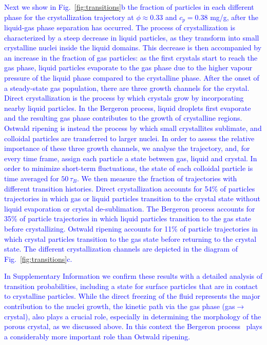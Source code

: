 \documentclass[preprint,amsmath,amssymb,superscriptaddress]{revtex4-1}
\begin{document}
\textcolor{blue}{
Next we show in Fig.~\ref{fig:transitions}b the fraction of particles in each different phase for the crystallization trajectory at
$\phi\approx 0.33$ and $c_p=0.38$ mg/g, after the liquid-gas phase separation has occurred.
The process of crystallization is characterized 
by a steep decrease in liquid particles, as they transform into small crystalline nuclei inside the liquid domains. This decrease
is then accompanied by an increase in the fraction of gas particles: as the first crystals start to reach the gas phase, liquid particles evaporate 
to the gas phase due to the higher vapour pressure of the liquid phase compared to the crystalline phase. After the onset 
of a steady-state gas population, there are three growth channels for the crystal. Direct crystallization is the process by which 
crystals grow by incorporating nearby liquid particles. In the Bergeron process, liquid droplets first evaporate and the resulting gas phase 
contributes to the growth of crystalline regions. Ostwald ripening is instead the process by which small crystallites sublimate, and colloidal
particles are transferred to larger nuclei. In order to assess the relative importance of these three growth channels, we analyse the trajectory, and, for every time frame, assign each particle a state between gas, liquid and crystal. In order to minimize short-term fluctuations, the state of each colloidal particle is time averaged for $50\,\tau_B$. We then measure the fraction of trajectories with different transition histories.
Direct crystallization accounts for 54\% of particles trajectories in which
gas or liquid particles transition to the crystal state without liquid evaporation or crystal de-sublimation. The Bergeron process accounts for 35\% of particle trajectories in which liquid particles
transition to the gas state before crystallizing. Ostwald ripening accounts for 11\% of particle trajectories in which crystal particles transition to the gas state before returning
to the crystal state. The different crystallization channels are depicted in the diagram of Fig.~\ref{fig:transitions}c.}

\textcolor{blue}{
In Supplementary Information we confirm these results with a detailed analysis of transition probabilities, including a state for surface particles that are in contact 
to crystalline particles.
While the direct freezing of the fluid represents the major contribution to the nuclei growth, the kinetic path via the gas phase (gas$\rightarrow$crystal), also plays a crucial role,
especially in determining the morphology of the porous crystal, as we discussed above. In this context the Bergeron process~\cite{glickman2000glossary,morrison2012resilience}
plays a considerably more important role than Ostwald ripening.}
\end{document}
